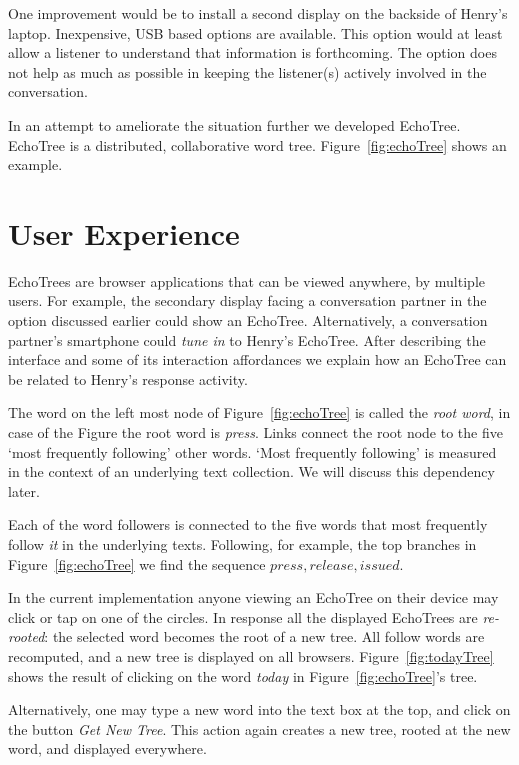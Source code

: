 \documentclass{sigchi}
\begin{document}
One improvement would be to install a second display on the backside
of Henry's laptop. Inexpensive, USB based options are available. This
option would at least allow a listener to understand that information
is forthcoming. The option does not help as much as possible in
keeping the listener(s) actively involved in the conversation. 

In an attempt to ameliorate the situation further we developed
EchoTree. EchoTree is a distributed, collaborative word
tree. Figure~\ref{fig:echoTree} shows an example.

\section{User Experience}

EchoTrees are browser applications that can be viewed anywhere, by
multiple users. For example, the secondary display facing a
conversation partner in the option discussed earlier could show an
EchoTree. Alternatively, a conversation partner's smartphone could
{\em tune in} to Henry's EchoTree. After describing the interface and
some of its interaction affordances we explain how an EchoTree can be
related to Henry's response activity.

The word on the left most node of Figure~\ref{fig:echoTree} is called
the {\em root word}, in case of the Figure the root word is {\em
  press}. Links connect the root node to the five `most frequently
following' other words.  `Most frequently following' is measured in
the context of an underlying text collection. We will discuss this
dependency later.

Each of the word followers is connected to the five words that most
frequently follow {\em it} in the underlying texts. Following, for
example, the top branches in Figure~\ref{fig:echoTree} we find the
sequence ${press, release, issued}$.

In the current implementation anyone viewing an EchoTree on their
device may click or tap on one of the circles. In response all the
displayed EchoTrees are {\em re-rooted}: the selected word becomes the
root of a new tree. All follow words are recomputed, and a new tree is
displayed on all browsers. Figure~\ref{fig:todayTree} shows the result
of clicking on the word {\em today} in Figure~\ref{fig:echoTree}'s
tree. 

Alternatively, one may type a new word into the text box at the top,
and click on the button {\em Get New Tree}. This action again creates
a new tree, rooted at the new word, and displayed everywhere.
\end{document}
